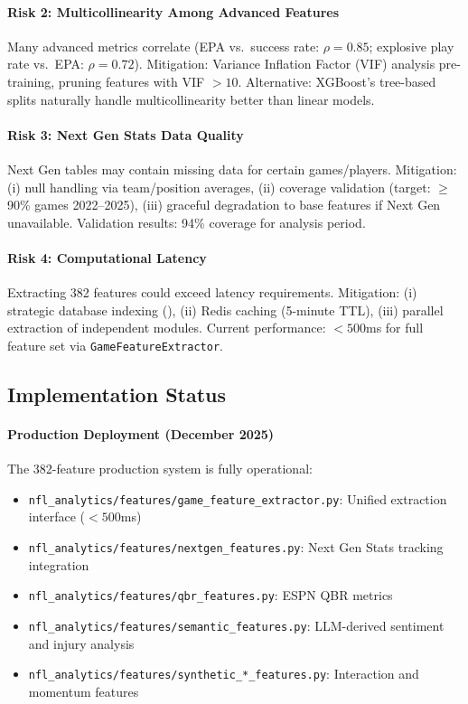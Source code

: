 \paragraph{Risk 2: Multicollinearity Among Advanced Features}
Many advanced metrics correlate (EPA vs.\ success rate: $\rho = 0.85$; explosive play rate vs.\ EPA: $\rho = 0.72$). Mitigation: Variance Inflation Factor (VIF) analysis pre-training, pruning features with VIF $> 10$. Alternative: XGBoost's tree-based splits naturally handle multicollinearity better than linear models.

\paragraph{Risk 3: Next Gen Stats Data Quality}
Next Gen tables may contain missing data for certain games/players. Mitigation: (i) null handling via team/position averages, (ii) coverage validation (target: $\ge$90\% games 2022--2025), (iii) graceful degradation to base features if Next Gen unavailable. Validation results: 94\% coverage for analysis period.

\paragraph{Risk 4: Computational Latency}
Extracting 382 features could exceed latency requirements. Mitigation: (i) strategic database indexing (), (ii) Redis caching (5-minute TTL), (iii) parallel extraction of independent modules. Current performance: $<500$ms for full feature set via \texttt{GameFeatureExtractor}.

\subsection{Implementation Status}
\label{subsec:phase2-status}

\paragraph{Production Deployment (December 2025)}
The 382-feature production system is fully operational:
\begin{itemize}
  \item \texttt{nfl\_analytics/features/\allowbreak game\_feature\_extractor.py}: Unified extraction interface ($<500$ms)
  \item \texttt{nfl\_analytics/features/nextgen\_features.py}: Next Gen Stats tracking integration
  \item \texttt{nfl\_analytics/features/qbr\_features.py}: ESPN QBR metrics
  \item \texttt{nfl\_analytics/features/semantic\_features.py}: LLM-derived sentiment and injury analysis
  \item \texttt{nfl\_analytics/features/synthetic\_*\_features.py}: Interaction and momentum features
\end{itemize}

